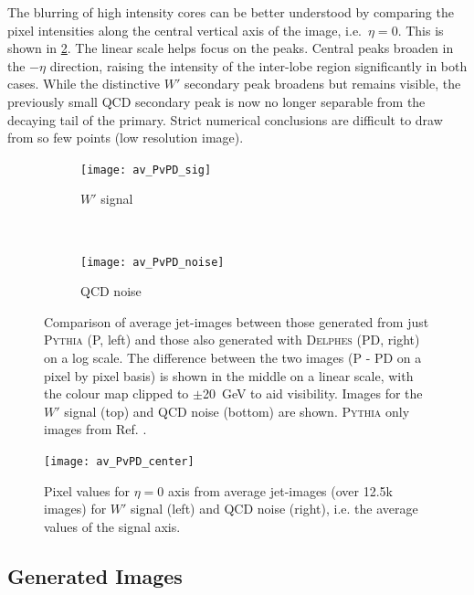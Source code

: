 \documentclass[twocolumn]{article}
\newcommand{\pkg}[1]{\textsc{#1}}
\begin{document}
The blurring of high intensity cores can be better understood by comparing the pixel intensities along the central vertical axis of the image, i.e.~$\eta=0$. This is shown in \cref{fig:delphes_middle}. The linear scale helps focus on the peaks. Central peaks broaden in the $-\eta$ direction, raising the intensity of the inter-lobe region significantly in both cases. While the distinctive $W'$ secondary peak broadens but remains visible, the previously small QCD secondary peak is now no longer separable from the decaying tail of the primary. Strict numerical conclusions are difficult to draw from so few points (low resolution image).


  
\begin{figure}[!htbp]
	\centering
	\begin{subfigure}[t]{1.0\textwidth}
		\centering
		\texttt{[image: av\_PvPD\_sig]}
		\caption{$W'$ signal}
	\end{subfigure}%
	\\
	\begin{subfigure}[t]{1.0\textwidth}
		\centering
		\texttt{[image: av\_PvPD\_noise]}
		\caption{QCD noise}
	\end{subfigure}

	\caption{Comparison of average jet-images between those generated from just \pkg{Pythia} (P, left) and those also generated with \pkg{Delphes} (PD, right) on a log scale. The difference between the two images (P - PD on a pixel by pixel basis) is shown in the middle on a linear scale, with the colour map clipped to $\pm$\SI{20}{\giga\electronvolt} to aid visibility. Images for the $W'$ signal (top) and QCD noise (bottom) are shown. \pkg{Pythia} only images from Ref. \cite{de2017learning}. }
	\label{fig:delphes_ims}
\end{figure}

\begin{figure}[!htbp]
	\centering
	\texttt{[image: av\_PvPD\_center]}
	
	\caption{Pixel values for $\eta=0$ axis from average jet-images (over 12.5k images)  for $W'$ signal (left) and QCD noise (right), i.e. the average values of the signal axis.}
	\label{fig:delphes_middle}
	
\end{figure} 

\subsection{Generated Images}
\label{sec:genims}
\end{document}
